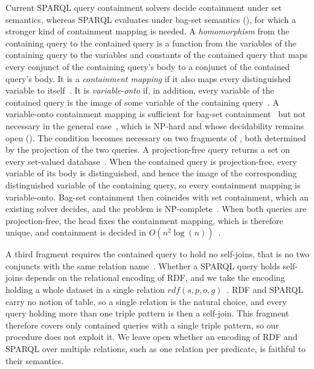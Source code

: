 Current SPARQL query containment solvers decide containment under set semantics, whereas SPARQL evaluates under bag-set semantics (), for which a stronger kind of containment mapping is needed.
A \emph{homomorphism} from the containing query to the contained query is a function from the variables of the containing query to the variables and constants of the contained query that maps every conjunct of the containing query's body to a conjunct of the contained query's body.
It is a \emph{containment mapping} if it also maps every distinguished variable to itself~\cite{Chaudhuri1993}.
It is \emph{variable-onto} if, in addition, every variable of the contained query is the image of some variable of the containing query~\cite{Chaudhuri1993}.
A variable-onto containment mapping is sufficient for bag-set containment~\cite[Proposition~2, Case~3]{Afrati2010} but not necessary in the general case~\cite[Example~3]{Afrati2010}, which is NP-hard and whose decidability remains open ().
The condition becomes necessary on two fragments of , both determined by the projection of the two queries.
A projection-free query returns a set on every set-valued database~\cite[Proposition~3]{Afrati2010}.
When the contained query is projection-free, every variable of its body is distinguished, and hence the image of the corresponding distinguished variable of the containing query, so every containment mapping is variable-onto.
Bag-set containment then coincides with set containment, which an existing solver decides, and the problem is NP-complete~\cite[Theorem~1]{Afrati2010}.
When both queries are projection-free, the head fixes the containment mapping, which is therefore unique, and containment is decided in $O(n^2\log(n))$~\cite[Remark~1]{Afrati2010}.

A third fragment requires the contained query to hold no self-joins, that is no two conjuncts with the same relation name~\cite[Theorem~3]{Afrati2010}.
Whether a SPARQL query holds self-joins depends on the relational encoding of \ac{RDF}, and we take the encoding holding a whole dataset in a single relation $\mathit{rdf}(s, p, o, g)$~\cite{angles2008expressive, cyganiak2005relational}.
\ac{RDF} and SPARQL carry no notion of table, so a single relation is the natural choice, and every query holding more than one triple pattern is then a self-join.
This fragment therefore covers only contained queries with a single triple pattern, so our procedure does not exploit it.
We leave open whether an encoding of \ac{RDF} and SPARQL over multiple relations, such as one relation per predicate, is faithful to their semantics.

